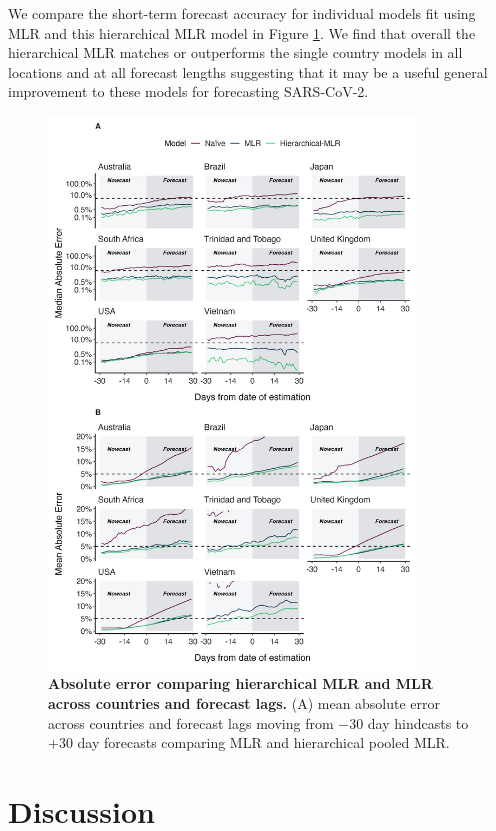 \documentclass[11pt,oneside,letterpaper]{article}
\begin{document}
We compare the short-term forecast accuracy for individual models fit using MLR and this hierarchical MLR model in Figure \ref{fig:model_comp_PooledMLR}.
We find that overall the hierarchical MLR matches or outperforms the single country models in all locations and at all forecast lengths suggesting that it may be a useful general improvement to these models for forecasting SARS-CoV-2.

\begin{figure}[tb!]
	\centering
	\includegraphics[width=0.87\textwidth]{figures/model_comp_PooledMLR.png}
	\caption{\textbf{Absolute error comparing hierarchical MLR and MLR across countries and forecast lags.}
	(A) mean absolute error across countries and forecast lags moving from $-30$ day hindcasts to $+30$ day forecasts comparing MLR and hierarchical pooled MLR.
	}
	\label{fig:model_comp_PooledMLR}
\end{figure}

\section*{Discussion}
\end{document}
